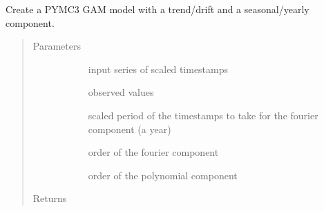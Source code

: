 \documentclass[letterpaper,10pt,english]{sphinxmanual}
\begin{document}
\begin{fulllineitems}
\label{\detokenize{autoapi/src/model/model/index:src.model.model.create_model}}
Create a PYMC3 GAM model with a trend/drift and a seasonal/yearly component.
\begin{quote}\begin{description}
\item[{Parameters}] \leavevmode\begin{description}
\item[{}] \leavevmode{[}\sphinxcode{\sphinxupquote{timestamps}}{]}
input series of scaled timestamps

\item[{}] \leavevmode{[}\sphinxhref{https://docs.python.org/3/library/functions.html\#float}{\sphinxcode{\sphinxupquote{float}}}{]}
observed values

\item[{}] \leavevmode
scaled period of the timestamps to take for the fourier component (a year)

\item[{}] \leavevmode{[}\sphinxhref{https://docs.python.org/3/library/functions.html\#int}{\sphinxcode{\sphinxupquote{int}}}{]}
order of the fourier component

\item[{}] \leavevmode
order of the polynomial component

\end{description}

\item[{Returns}] \leavevmode\begin{description}
\item[{  }] \leavevmode
\end{description}

\end{description}\end{quote}

\end{fulllineitems}
\end{document}
